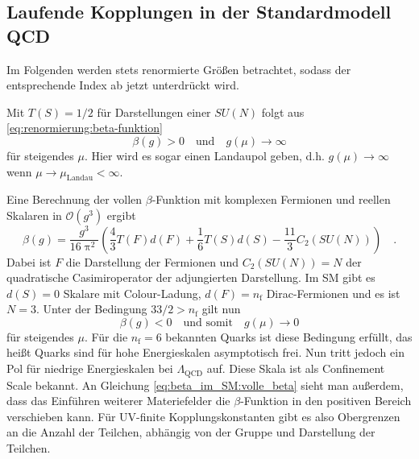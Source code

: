 \subsection{Laufende Kopplungen in der Standardmodell QCD}\label{beta_im_SM}
	Im Folgenden werden stets renormierte Größen betrachtet, sodass der 
	entsprechende Index ab jetzt unterdrückt wird.
	
	Mit $T(S)=1/2$ für Darstellungen einer $SU(N)$ folgt aus 
   \eqref{eq:renormierung:beta-funktion} 
   \begin{equation}
	\beta(g)>0 \quad \text{und} \quad    
   g(\mu) \longrightarrow \infty
   \label{eq:beta_im_SM:landau_pol}
   \end{equation}
   für steigendes $\mu$. Hier wird es sogar einen Landaupol geben, d.h. 
   $g(\mu)\to \infty$ wenn $\mu\to \mu_\text{Landau}<\infty$.  
   
   Eine Berechnung der vollen $\beta$-Funktion mit komplexen Fermionen und 
   reellen Skalaren in 
   $\mathcal{O}(g^3)$ ergibt 
   \cite{Luo_Wang_Xiao} 
   \begin{equation}
   \beta(g)=\frac{g^3}{16\uppi^2} \left( \frac{4}{3} T(F)d(F) +
   \frac{1}{6} T(S) d(S) - \frac{11}{3} C_2(SU(N)) \right)\quad .
   \label{eq:beta_im_SM:volle_beta}
   \end{equation}
   Dabei ist $F$ die Darstellung der Fermionen und $C_2(SU(N))=N$ der 
   quadratische Casimiroperator der adjungierten Darstellung. Im SM 
   gibt es $d(S)=0$ Skalare mit Colour-Ladung, $d(F)=n_\text{f}$ Dirac-Fermionen und 
   es ist $N=3$. Unter der Bedingung $33/2  >  n_\text{f}$ gilt nun 
	\begin{equation}
	\beta(g)<0 \quad \text{und somit} \quad g(\mu) \longrightarrow 0
	\end{equation}	   
	für steigendes $\mu$. Für die $n_\text{f}=6$ bekannten Quarks ist diese 
	Bedingung erfüllt, das heißt Quarks sind für hohe Energieskalen 
	asymptotisch frei. 
	Nun tritt jedoch ein Pol für niedrige Energieskalen bei $\Lambda_\text{QCD}$ 
	auf. Diese Skala ist als Confinement Scale bekannt.	
	An Gleichung \eqref{eq:beta_im_SM:volle_beta} 
	sieht man außerdem, dass das Einführen weiterer Materiefelder 
	die $\beta$-Funktion in den positiven Bereich verschieben kann. Für 
	UV-finite Kopplungskonstanten gibt es also Obergrenzen an die Anzahl der 
	Teilchen, abhängig von der Gruppe und Darstellung der Teilchen.
	
   
   